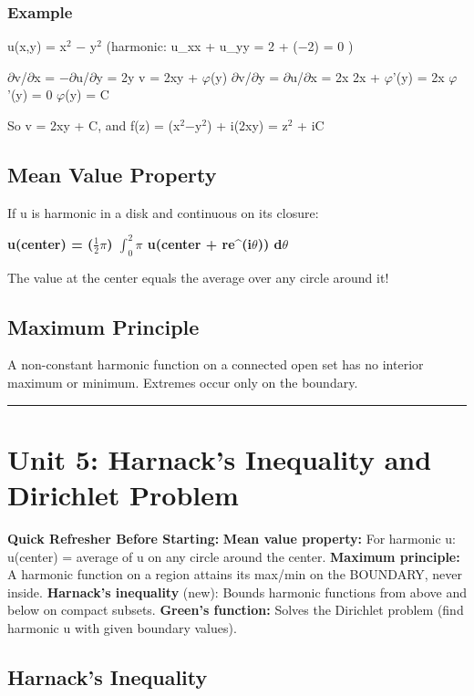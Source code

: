 \documentclass[12pt,a4paper,openany]{book}
\begin{document}
{{\subsubsection{Example}
u(x,y) = x$^2$ − y$^2$ (harmonic: u_xx + u_yy = 2 + (−2) = 0 )

$\partial$v/$\partial$x = −$\partial$u/$\partial$y = 2y  v = 2xy + $\varphi$(y)
$\partial$v/$\partial$y = $\partial$u/$\partial$x = 2x  2x + $\varphi$'(y) = 2x  $\varphi$'(y) = 0  $\varphi$(y) = C

So v = 2xy + C, and f(z) = (x$^2$−y$^2$) + i(2xy) = z$^2$ + iC 

\subsection{Mean Value Property }
If u is harmonic in a disk and continuous on its closure:

\textbf{u(center) = ($\frac{1}{2}$$\pi$) $\int_0^2\pi$ u(center + re^(i$\theta$)) d$\theta$}

The value at the center equals the average over any circle around it!

\subsection{Maximum Principle }
A non-constant harmonic function on a connected open set has no interior maximum or minimum. Extremes occur only on the boundary.

\bigskip\noindent\rule{\textwidth}{0.4pt}\bigskip

\section{Unit 5: Harnack's Inequality and Dirichlet Problem}

\begin{prereqbox}
 \textbf{Quick Refresher Before Starting:}
\textbf{Mean value property:} For harmonic u: u(center) = average of u on any circle around the center.
\textbf{Maximum principle:} A harmonic function on a region attains its max/min on the BOUNDARY, never inside.
\textbf{Harnack's inequality} (new): Bounds harmonic functions from above and below on compact subsets.
\textbf{Green's function:} Solves the Dirichlet problem (find harmonic u with given boundary values).
\end{prereqbox}


\subsection{Harnack's Inequality}

}}
\end{document}
